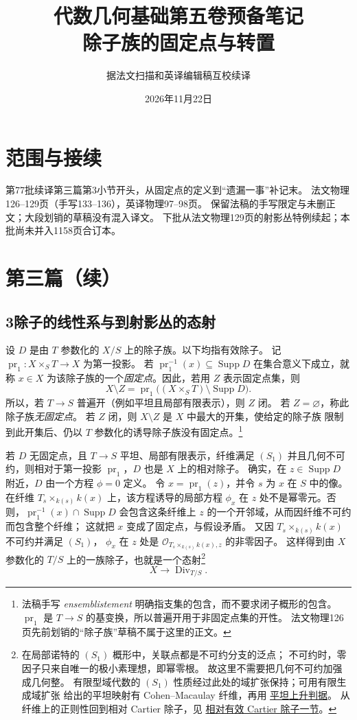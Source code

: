 \documentclass[openany,fontset=fandol]{ctexbook}
\DeclareMathOperator{\Div}{Div}
\DeclareMathOperator{\pr}{pr}
\DeclareMathOperator{\Supp}{Supp}
\newcommand{\OO}{\mathcal O}
\begin{document}
\title{代数几何基础第五卷预备笔记\\除子族的固定点与转置}
\author{据法文扫描和英译编辑稿互校续译}
\date{2026年11月22日}
\maketitle
\chapter*{范围与接续}
第77批续译第三篇第3小节开头，从固定点的定义到“遗漏一事”补记末。
法文物理126--129页（手写133--136），英译物理97--98页。
保留法稿的手写限定与未删正文；大段划销的草稿没有混入译文。
下批从法文物理129页的射影丛特例续起；本批尚未并入1158页合订本。
\chapter*{第三篇（续）}
\section*{3\quad 除子的线性系与到射影丛的态射}
设 \(D\) 是由 \(T\) 参数化的 \(X/S\) 上的除子族。以下均指有效除子。
记 \(\pr_1:X\times_S T\to X\) 为第一投影。
若 \(\pr_1^{-1}(x)\subseteq \Supp D\) 在集合意义下成立，就称 \(x\in X\)
为该除子族的一个\emph{固定点}。因此，若用 \(Z\) 表示固定点集，则
\[
 X\setminus Z
  =\pr_1\bigl((X\times_S T)\setminus\Supp D\bigr).
\]
所以，若 \(T\to S\) 普遍开（例如平坦且局部有限表示），则 \(Z\) 闭。
若 \(Z=\varnothing\)，称此除子族\emph{无固定点}。
若 \(Z\) 闭，则 \(X\setminus Z\) 是 \(X\) 中最大的开集，使给定的除子族
限制到此开集后、仍以 \(T\) 参数化的诱导除子族没有固定点。\footnote{法稿手写
\emph{ensemblistement} 明确指支集的包含，而不要求闭子概形的包含。
\(\pr_1\) 是 \(T\to S\) 的基变换，所以普遍开用于非固定点集的开性。
法文物理126页先前划销的“除子族”草稿不属于这里的正文。}

若 \(D\) 无固定点，且 \(T\to S\) 平坦、局部有限表示，纤维满足 \((S_1)\)
并且几何不可约，则相对于第一投影 \(\pr_1\)，\(D\) 也是 \(X\) 上的相对除子。
确实，在 \(z\in\Supp D\) 附近，\(D\) 由一个方程 \(\phi=0\) 定义。
令 \(x=\pr_1(z)\)，并令 \(s\) 为 \(x\) 在 \(S\) 中的像。
在纤维 \(T_s\times_{k(s)}k(x)\) 上，该方程诱导的局部方程 \(\phi_x\)
在 \(z\) 处不是幂零元。否则，\(\pr_1^{-1}(x)\cap\Supp D\)
会包含这条纤维上 \(z\) 的一个开邻域，从而因纤维不可约而包含整个纤维；
这就把 \(x\) 变成了固定点，与假设矛盾。
又因 \(T_s\times_{k(s)}k(x)\) 不可约并满足 \((S_1)\)，
\(\phi_x\) 在 \(z\) 处是 \(\OO_{T_s\times_{k(s)}k(x),z}\) 的非零因子。
这样得到由 \(X\) 参数化的 \(T/S\) 上的一族除子，也就是一个态射\footnote{在局部诺特的 \((S_1)\) 概形中，关联点都是不可约分支的泛点；
不可约时，零因子只来自唯一的极小素理想，即幂零根。
故这里不需要把几何不可约加强成几何整。
有限型域代数的 \((S_1)\) 性质经过此处的域扩张保持；可用有限生成域扩张
给出的平坦映射有 Cohen--Macaulay 纤维，再用
\href{https://stacks.math.columbia.edu/tag/0336}{平坦上升判据}。
从纤维上的正则性回到相对 Cartier 除子，见
\href{https://stacks.math.columbia.edu/tag/056P}{相对有效 Cartier 除子一节}。}
\[
 X\longrightarrow\Div_{T/S}.
\]
\end{document}
